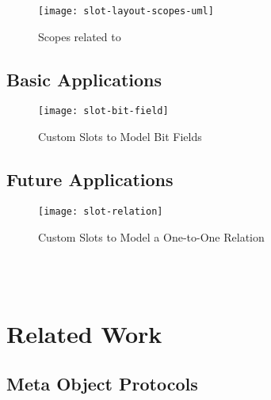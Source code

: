 \begin{figure}[h]
	\centering
	\texttt{[image: slot-layout-scopes-uml]}
	\caption{Scopes related to }
\end{figure}

\subsection{Basic Applications}

\begin{figure}[h]
	\centering
	\texttt{[image: slot-bit-field]}
	\caption{Custom Slots to Model Bit Fields}
\end{figure}


\subsection{Future Applications}

\begin{figure}[h]
	\centering
	\texttt{[image: slot-relation]}
	\caption{Custom Slots to Model a One-to-One Relation}
\end{figure}

 \\
 \\


\section{Related Work}

\subsection{Meta Object Protocols}
 \\
 \\
 \\

